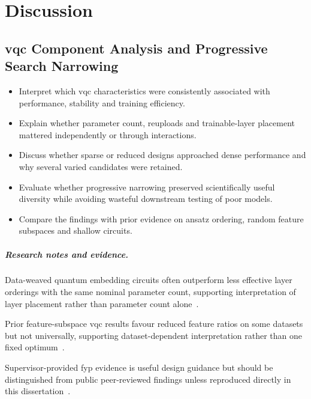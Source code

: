 \documentclass[]{UCD_CS_MSc_AAI_Report}
\newcommand{\limitation}[1]{{\color{orange}#1}}
\newcommand{\result}[1]{{\color{green!60!black}#1}}
\newcommand{\comparison}[1]{{\color{pink!70!violet}#1}}
\newcommand{\researchnotes}{\paragraph{Research notes and evidence.}}
\begin{document}
\chapter{Discussion}
\label{chap:discussion}

\section{\acs*{vqc} Component Analysis and Progressive Search Narrowing}
\label{sec:discussion-vqc}
\begin{itemize}
    \item Interpret which \ac{vqc} characteristics were consistently associated with performance, stability and training efficiency.
    \item Explain whether parameter count, reuploads and trainable-layer placement mattered independently or through interactions.
    \item Discuss whether sparse or reduced designs approached dense performance and why several varied candidates were retained.
    \item Evaluate whether progressive narrowing preserved scientifically useful diversity while avoiding wasteful downstream testing of poor models.
    \item Compare the findings with prior evidence on ansatz ordering, random feature subspaces and shallow circuits.
\end{itemize}

\researchnotes
\begin{itemize}
    \comparison{\item Data-weaved quantum embedding circuits often outperform less effective layer orderings with the same nominal parameter count, supporting interpretation of layer placement rather than parameter count alone~\cite{salmenpera_impact_2024}.}
    \result{\item Prior feature-subspace \ac{vqc} results favour reduced feature ratios on some datasets but not universally, supporting dataset-dependent interpretation rather than one fixed optimum~\cite{radojicic_reducing_2026}.}
    \limitation{\item Supervisor-provided \ac{fyp} evidence is useful design guidance but should be distinguished from public peer-reviewed findings unless reproduced directly in this dissertation~\cite{radojicic_reducing_2026,pinto_composing_2026}.}
\end{itemize}
\end{document}
